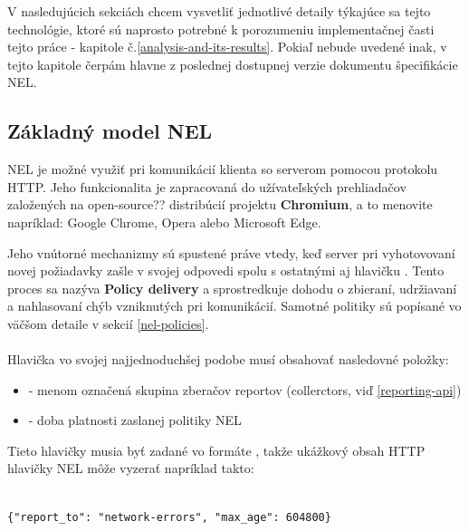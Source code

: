 V nasledujúcich sekciách chcem vysvetliť jednotlivé detaily týkajúce sa tejto technológie, ktoré sú naprosto potrebné k porozumeniu 
implementačnej časti tejto práce - kapitole č.\ref{analysis-and-its-results}. Pokiaľ nebude uvedené inak, v tejto kapitole čerpám hlavne 
z poslednej dostupnej verzie dokumentu špecifikácie NEL\cite{W3C-NEL}.

\subsection{Základný model NEL}

NEL je možné využiť pri komunikácií klienta so serverom pomocou protokolu HTTP. Jeho funkcionalita je zapracovaná do užívateľských 
prehliadačov založených na open-source?? distribúcií projektu \textbf{Chromium}, a to menovite napríklad: Google Chrome, Opera alebo 
Microsoft Edge. 

Jeho vnútorné mechanizmy sú spustené práve vtedy, keď server pri vyhotovovaní novej požiadavky zašle v svojej odpovedi spolu s ostatnými 
aj hlavičku . Tento proces sa nazýva \textbf{Policy delivery} a sprostredkuje dohodu o zbieraní, udržiavaní a nahlasovaní chýb 
vzniknutých pri komunikácií. Samotné politiky sú popísané vo väčšom detaile v sekcií \ref{nel-policies}.
\\
\\
Hlavička  vo svojej najjednoduchšej podobe musí obsahovať nasledovné položky: 

\begin{itemize}
    \item {} - menom označená skupina zberačov reportov (collerctors, viď \ref{reporting-api}) 
    \item {} - doba platnosti zaslanej politiky NEL
\end{itemize}

Tieto hlavičky musia byť zadané vo formáte , takže ukážkový obsah HTTP hlavičky NEL môže vyzerať 
napríklad takto:

\begin{lstlisting}[caption={Ukážka obsahu najjednoduchšej/minimálnej HTTP hlavičky NEL. Akékoľvek chyby budú hlásené do skupiny 
    \code{network-errors} po dobu platnosti tejto politiky, ktorá bola nastavená na 7 dní (604 800 / 60s / 60min / 24h)}]

{"report_to": "network-errors", "max_age": 604800}

\end{lstlisting}

